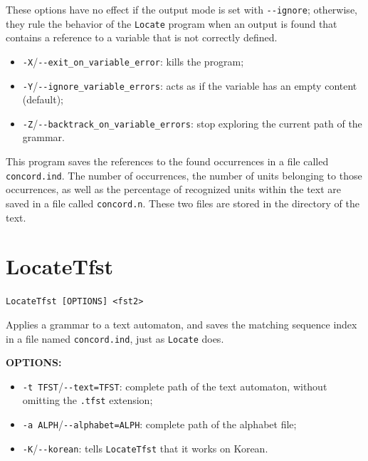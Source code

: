\noindent These options have no effect if the output mode is set with
\verb+--ignore+; otherwise, they rule the behavior of the \verb+Locate+ program
when an output is found that contains a reference to a variable that is not correctly defined.
\begin{itemize}
  \item \verb+-X+/\verb+--exit_on_variable_error+: kills the program;
  \item \verb+-Y+/\verb+--ignore_variable_errors+: acts as if the variable has
  an empty content (default);
  \item \verb+-Z+/\verb+--backtrack_on_variable_errors+: stop exploring the
  current path of the grammar.
\end{itemize}
  

\bigskip
\noindent {}This 
program saves the references to the found occurrences in a file called
\verb+concord.ind+. The number of occurrences, the number of units belonging to
those occurrences, as well as the percentage of recognized units within the text
are saved in a file called \verb+concord.n+. These two files are stored in the
directory of the text.







\section{LocateTfst}
\label{section-LocateTfst}
\verb+LocateTfst [OPTIONS] <fst2>+

\bigskip
\noindent {}
Applies a grammar to a text automaton, and saves the matching sequence index in a
file named \verb+concord.ind+, just as \verb+Locate+ does.

\bigskip
\noindent \textbf{OPTIONS:}
\begin{itemize}
  \item \verb+-t TFST+/\verb+--text=TFST+: complete path of the text automaton,
  without omitting the \verb+.tfst+ extension;

  \item \verb+-a ALPH+/\verb+--alphabet=ALPH+: complete path of the alphabet
  file;
  
  \item \verb+-K+/\verb+--korean+: tells \verb+LocateTfst+ that it works on
  Korean.
  
\end{itemize}

